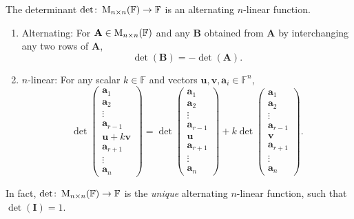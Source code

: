 \documentclass[../Notes.tex]{subfiles}
\begin{document}
\begin{theorem}{}{}
    The determinant \(\det\colon\operatorname{M}_{n \times n}(\mathbb{F})\to \mathbb{F}\) is an alternating \(n\)-linear function. 
    \begin{enumerate}[label=(\alph*)]
        \item Alternating: For \(\mathbf{A}\in\operatorname{M}_{n \times n}(\mathbb{F})\) and any \(\mathbf{B}\) obtained from \(\mathbf{A}\) by interchanging any two rows of \(\mathbf{A}\),
        \[\det(\mathbf{B})=-\det(\mathbf{A}).\]
        \item \(n\)-linear: For any scalar \(k \in \mathbb{F}\) and vectors \(\mathbf{u},\mathbf{v},\mathbf{a}_i\in \mathbb{F}^n\),
        \[\det\begin{pmatrix}
            \mathbf{a}_1\\
            \mathbf{a}_2\\
            \vdots\\
            \mathbf{a}_{r-1}\\
            \mathbf{u}+k\mathbf{v}\\
            \mathbf{a}_{r+1}\\
            \vdots\\
            \mathbf{a}_n
        \end{pmatrix}=
        \det\begin{pmatrix}
            \mathbf{a}_1\\
            \mathbf{a}_2\\
            \vdots\\
            \mathbf{a}_{r-1}\\
            \mathbf{u}\\
            \mathbf{a}_{r+1}\\
            \vdots\\
            \mathbf{a}_n
        \end{pmatrix}+
        k\det\begin{pmatrix}
            \mathbf{a}_1\\
            \mathbf{a}_2\\
            \vdots\\
            \mathbf{a}_{r-1}\\
            \mathbf{v}\\
            \mathbf{a}_{r+1}\\
            \vdots\\
            \mathbf{a}_n
        \end{pmatrix}.\]
    \end{enumerate}
    In fact, \(\det\colon\operatorname{M}_{n \times n}(\mathbb{F})\to \mathbb{F}\) is the \emph{unique} alternating \(n\)-linear function, such that \(\det(\mathbf{I})=1\).
\end{theorem}
\end{document}
